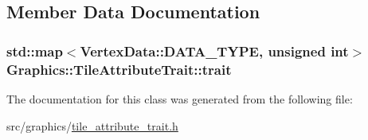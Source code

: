 \subsection{Member Data Documentation}
\hypertarget{class_graphics_1_1_tile_attribute_trait_a207820d288507ca70df8f95d7fdd04db}{}
\subsubsection[{trait}]{\setlength{\rightskip}{0pt plus 5cm}std\+::map$<${\bf Vertex\+Data\+::\+D\+A\+T\+A\+\_\+\+T\+Y\+P\+E}, unsigned int$>$ Graphics\+::\+Tile\+Attribute\+Trait\+::trait\hspace{0.3cm}{\ttfamily [private]}}\label{class_graphics_1_1_tile_attribute_trait_a207820d288507ca70df8f95d7fdd04db}


The documentation for this class was generated from the following file\+:\begin{DoxyCompactItemize}
\item 
src/graphics/\hyperlink{tile__attribute__trait_8h}{tile\+\_\+attribute\+\_\+trait.\+h}\end{DoxyCompactItemize}
